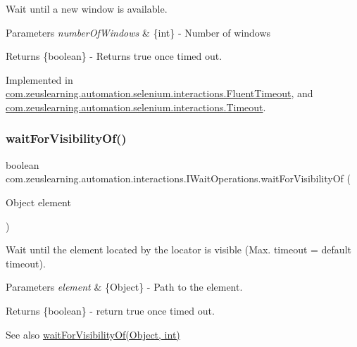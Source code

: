 Wait until a new window is available.


\begin{DoxyParams}{Parameters}
{\em number\+Of\+Windows} & \{int\} -\/ Number of windows \\
\hline
\end{DoxyParams}
\begin{DoxyReturn}{Returns}
\{boolean\} -\/ Returns {\ttfamily true} once timed out. 
\end{DoxyReturn}


Implemented in \hyperlink{classcom_1_1zeuslearning_1_1automation_1_1selenium_1_1interactions_1_1FluentTimeout_a9d12d8da29ae600e1955e244a79f2ec0}{com.\+zeuslearning.\+automation.\+selenium.\+interactions.\+Fluent\+Timeout}, and \hyperlink{classcom_1_1zeuslearning_1_1automation_1_1selenium_1_1interactions_1_1Timeout_a82895e2aaa48ce6d3d8fecd0d2042db6}{com.\+zeuslearning.\+automation.\+selenium.\+interactions.\+Timeout}.

\hypertarget{interfacecom_1_1zeuslearning_1_1automation_1_1interactions_1_1IWaitOperations_ad52fa72b8387c5172714bdec02b754a9}{}\label{interfacecom_1_1zeuslearning_1_1automation_1_1interactions_1_1IWaitOperations_ad52fa72b8387c5172714bdec02b754a9} 
\subsubsection{\texorpdfstring{wait\+For\+Visibility\+Of()}{waitForVisibilityOf()}\hspace{0.1cm}{\footnotesize\ttfamily [1/2]}}
{\footnotesize\ttfamily boolean com.\+zeuslearning.\+automation.\+interactions.\+I\+Wait\+Operations.\+wait\+For\+Visibility\+Of (\begin{DoxyParamCaption}\item[{Object}]{element }\end{DoxyParamCaption})}

Wait until the element located by the locator is visible (Max. timeout = default timeout).


\begin{DoxyParams}{Parameters}
{\em element} & \{Object\} -\/ Path to the element. \\
\hline
\end{DoxyParams}
\begin{DoxyReturn}{Returns}
\{boolean\} -\/ return {\ttfamily true} once timed out.
\end{DoxyReturn}
\begin{DoxySeeAlso}{See also}
\hyperlink{interfacecom_1_1zeuslearning_1_1automation_1_1interactions_1_1IWaitOperations_a608da544ffa2ea81c99c5cb17e8e60ba}{wait\+For\+Visibility\+Of(\+Object, int)} 
\end{DoxySeeAlso}


